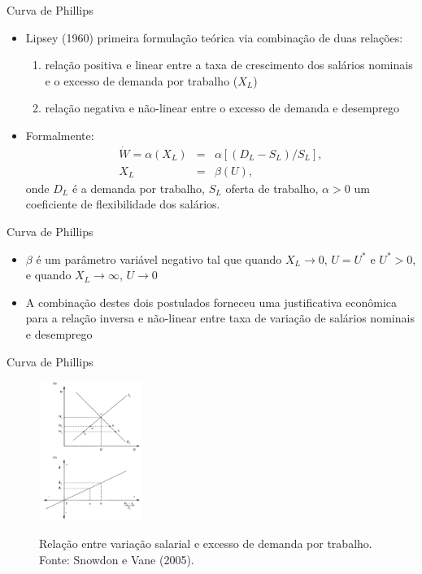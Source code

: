\documentclass[10pt]{beamer}
\begin{document}
\begin{frame}{Curva de Phillips}
    \begin{itemize}
        \item Lipsey (1960) primeira formulação teórica via combinação de duas relações:
        \bigskip
        \begin{enumerate}
            \item relação positiva e linear entre a taxa de crescimento dos salários nominais e o excesso de demanda por trabalho ($X_L$)
            \medskip
            \item relação negativa e não-linear entre o excesso de demanda e desemprego
        \end{enumerate}
        \bigskip
        \item Formalmente:
        \begin{eqnarray}
            \dot{W} = \alpha(X_L) &=& \alpha[(D_L - S_L)/S_L], \label{eq4} \\
            X_L &=& \beta(U), \label{eq5}
        \end{eqnarray}
        onde $D_L$ é a demanda por trabalho, $S_L$ oferta de trabalho, $\alpha > 0$ um coeficiente de flexibilidade dos salários.
    \end{itemize}
\end{frame}

\begin{frame}{Curva de Phillips}
    \begin{itemize}
        \item $\beta$ é um parâmetro variável negativo tal que quando $X_L \to 0$, $U = U^*$ e $U^*>0$, e quando $X_L \to \infty$, $U \to 0$
        \bigskip
        \item A combinação destes dois postulados forneceu uma justificativa econômica para a relação inversa e não-linear entre taxa de variação de salários nominais e desemprego
    \end{itemize}
\end{frame}

\begin{frame}{Curva de Phillips}
    \begin{figure}
        \centering
        \href{https://raw.githubusercontent.com/pvfonseca/pec/main/notas/figures/aula8_fig3.PNG}{\includegraphics[width=0.3\textwidth]{./figures/aula8_fig3.PNG}}
        \caption{Relação entre variação salarial e excesso de demanda por trabalho. Fonte: Snowdon e Vane (2005).}
        \label{fig11}
    \end{figure}
\end{frame}
\end{document}
